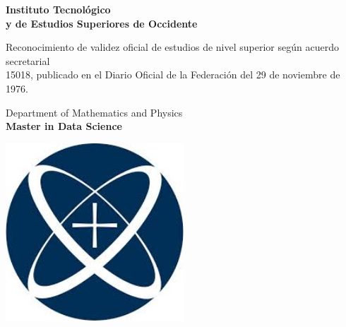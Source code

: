 \begin{titlepage}
\begin{fullwidth}
    \begin{center}
        \huge
        \textcolor{itesodblue}{\textbf{Instituto Tecnol\'ogico \\y de Estudios Superiores de Occidente}}\\
        
        \vspace*{0.1cm}
        
        \normalsize
        \textcolor{itesodblue}{Reconocimiento de validez oficial de estudios de nivel superior según acuerdo secretarial \\15018, publicado en el Diario Oficial de la Federación del 29 de noviembre de 1976.}\\
        
        \vspace*{0.5cm}
        
        \LARGE
        \textcolor{itesodblue}{Department of Mathematics and Physics}\\
        \textcolor{itesodblue}{\textbf{Master in Data Science}}
        
        \vspace*{1cm}
        
        \includegraphics[width=0.5\textwidth]{format/iteso.jpeg}
        
        \vspace*{1cm}
        
        \LARGE
        \textcolor{itesodblue}{\textbf{\mytitle}}
        

\end{center}
\end{fullwidth}
\end{titlepage}
